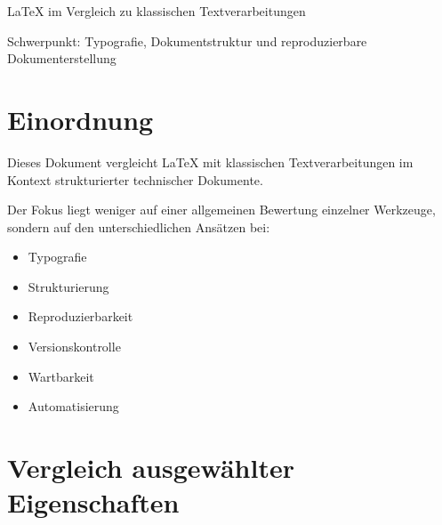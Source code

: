 \documentclass[11pt,a4paper]{article}
\begin{document}
{\headingfont\fontsize{20pt}{22pt}\selectfont
LaTeX im Vergleich zu klassischen Textverarbeitungen
}

\vspace{0.4cm}

Schwerpunkt: Typografie, Dokumentstruktur und reproduzierbare Dokumenterstellung

\vspace{0.8cm}

\section*{Einordnung}

Dieses Dokument vergleicht LaTeX mit klassischen Textverarbeitungen im Kontext strukturierter technischer Dokumente.

Der Fokus liegt weniger auf einer allgemeinen Bewertung einzelner Werkzeuge, sondern auf den unterschiedlichen Ansätzen bei:

\begin{itemize}
\item Typografie
\item Strukturierung
\item Reproduzierbarkeit
\item Versionskontrolle
\item Wartbarkeit
\item Automatisierung
\end{itemize}

\section*{Vergleich ausgewählter Eigenschaften}

\renewcommand{\arraystretch}{1.35}
\end{document}
